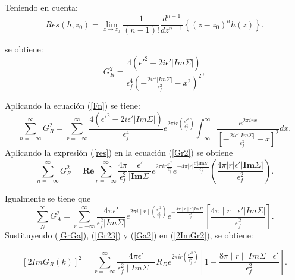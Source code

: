 \begin{frame}
  Teniendo en cuenta:
  \begin{equation}
    Res\left(h,z_{0}\right)=\lim_{z\rightarrow z_{0}}\frac{1}{\left(n-1\right)!}\frac{d^{n-1}}{dz^{n-1}}\left\{ \left(z-z_{0}\right)^{n}h\left(z\right)\right\}.
    \label{res}
  \end{equation}

  se obtiene:
  \begin{equation}
    G_{R}^{2}=\frac{4\left(\epsilon'^{2}-2i\epsilon'|Im\Sigma|\right)}{\epsilon_{f}^{4}\left(-\frac{2i\epsilon'|Im\Sigma|}{\epsilon_{f}^{2}}-x^{2}\right)^{2}},
    \label{Gr2}
  \end{equation}
\end{frame}

\begin{frame}
  Aplicando la ecuaci\'on (\ref{Fn}) se tiene:
  \begin{equation}
    \sum_{n=-\infty}^{\infty}G_{R}^{2}=\sum_{r=-\infty}^{\infty}\frac{4\left(\epsilon'^{2}-2i\epsilon'|Im\Sigma|\right)}{\epsilon_{f}^{4}}e^{2\pi ir\left(\frac{\epsilon'^{2}}{\epsilon_{f}^{2}}\right)}\int_{-\infty}^{\infty}\frac{e^{2\pi irx}}{\left[-\frac{2i\epsilon'|Im\Sigma|}{\epsilon_{f}^{2}}-x\right]^{2}}dx.
    \label{Gr22}
  \end{equation}
  Aplicando la expresi\'on (\ref{res}) en la ecuaci\'on (\ref{Gr2}) se obtiene
  \begin{equation}
      \sum_{n=-\infty}^{\infty}G_{R}^{2} =\textbf{Re} \sum_{r=-\infty}^{\infty}\frac{4\pi}{\epsilon_{f}^{2}}\frac{\epsilon'}{|\textbf{Im}\Sigma|} e^{2\pi i r \frac{\epsilon'^2}{\epsilon_{f}^{2}}} e^{-4\pi |r|\frac{\epsilon'|\textbf{Im}\Sigma|}{\epsilon_{f}^{2}}} \left( \frac{4\pi |r|\epsilon'|\textbf{Im}\Sigma|}{\epsilon_{f}^{2}}  \right).
      \label{Gr23}
  \end{equation}
\end{frame}

\begin{frame}
  Igualmente se tiene que
  \begin{equation}
    \sum_{N}^{\infty}G_{A}^{2}=\sum_{r=-\infty}^{\infty}\frac{4\pi\epsilon'}{\epsilon_{f}^{2}|Im\Sigma|}e^{2\pi i\mid r\mid\left(\frac{\epsilon'^{2}}{\epsilon_{f}^{2}}\right)}e^{-\frac{4\pi\mid r\mid\epsilon'|Im\Sigma|}{\epsilon_{f}^{2}}}\left[\frac{4\pi\mid r\mid\epsilon'|Im\Sigma|}{\epsilon_{f}^{2}}\right].
    \label{Ga2}
  \end{equation}
  Sustituyendo (\ref{GrGa}), (\ref{Gr23}) y (\ref{Ga2}) en (\ref{2ImGr2}), se obtiene:

  \begin{equation}
    \left[2ImG_{R}\left(k\right)\right]^{2}=\sum_{r=-\infty}^{\infty}\frac{4\pi\epsilon'}{\epsilon_{f}^{2}\mid Im\Sigma\mid}R_{D}e^{2\pi ir\left(\frac{\epsilon'^{2}}{\epsilon_{f}^{2}}\right)}\left[1+\frac{8\pi\mid r\mid\mid Im\Sigma\mid\epsilon'}{\epsilon_{f}^{2}}\right].
    \label{2ImGr22}
  \end{equation}
\end{frame}

